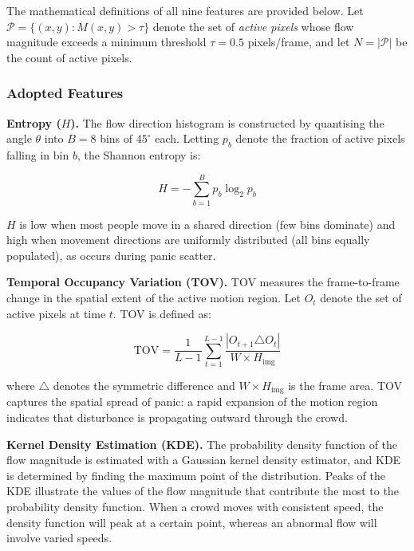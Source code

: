 The mathematical definitions of all nine features are provided below. Let $\mathcal{P} = \{(x,y) : M(x,y) > \tau\}$ denote the set of \textit{active pixels} whose flow magnitude exceeds a minimum threshold $\tau = 0.5$ pixels/frame, and let $N = |\mathcal{P}|$ be the count of active pixels.

\subsubsection{Adopted Features}

\textbf{Entropy ($H$).} The flow direction histogram is constructed by quantising the angle $\theta$ into $B = 8$ bins of $45^\circ$ each. Letting $p_b$ denote the fraction of active pixels falling in bin $b$, the Shannon entropy is:

\begin{equation}
  H = -\sum_{b=1}^{B} p_b \log_2 p_b
  \label{eq:entropy}
\end{equation}

$H$ is low when most people move in a shared direction (few bins dominate) and high when movement directions are uniformly distributed (all bins equally populated), as occurs during panic scatter.

\textbf{Temporal Occupancy Variation (TOV).} TOV measures the frame-to-frame change in the spatial extent of the active motion region. Let $O_t$ denote the set of active pixels at time $t$. TOV is defined as:

\begin{equation}
  \text{TOV} = \frac{1}{L-1} \sum_{t=1}^{L-1} \frac{|O_{t+1} \triangle O_t|}{W \times H_{\text{img}}}
  \label{eq:tov}
\end{equation}

\noindent where $\triangle$ denotes the symmetric difference and $W \times H_{\text{img}}$ is the frame area. TOV captures the spatial spread of panic: a rapid expansion of the motion region indicates that disturbance is propagating outward through the crowd.

\textbf{Kernel Density Estimation (KDE).} The probability density function of the flow magnitude is estimated with a Gaussian kernel density estimator, and KDE is determined by finding the maximum point of the distribution. Peaks of the KDE illustrate the values of the flow magnitude that contribute the most to the probability density function. When a crowd moves with consistent speed, the density function will peak at a certain point, whereas an abnormal flow will involve varied speeds.

